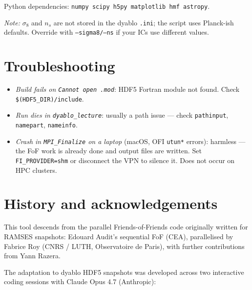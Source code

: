 \documentclass[11pt,a4paper]{article}
\begin{document}
\noindent Python dependencies: \texttt{numpy scipy h5py matplotlib hmf astropy}.

\noindent \emph{Note:} $\sigma_8$ and $n_s$ are not stored in the dyablo
\texttt{.ini}; the script uses Planck-ish defaults. Override with
\texttt{--sigma8/--ns} if your ICs use different values.

\section{Troubleshooting}

\begin{itemize}\itemsep0pt
  \item \emph{Build fails on \texttt{Cannot open .mod}}: HDF5 Fortran module
        not found. Check \texttt{\$(HDF5\_DIR)/include}.
  \item \emph{Run dies in \texttt{dyablo\_lecture}}: usually a path issue ---
        check \texttt{pathinput}, \texttt{namepart}, \texttt{nameinfo}.
  \item \emph{Crash in \texttt{MPI\_Finalize} on a laptop} (macOS, OFI
        \texttt{utun*} errors): harmless --- the FoF work is already done and
        output files are written. Set \texttt{FI\_PROVIDER=shm} or disconnect
        the VPN to silence it. Does not occur on HPC clusters.
\end{itemize}

\section{History and acknowledgements}

This tool descends from the parallel Friends-of-Friends code originally written
for RAMSES snapshots: Edouard Audit's sequential FoF (CEA), parallelised by
Fabrice Roy (CNRS / LUTH, Observatoire de Paris), with further contributions
from Yann Razera.

The adaptation to dyablo HDF5 snapshots was developed across two interactive
coding sessions with Claude Opus 4.7 (Anthropic):
\end{document}
